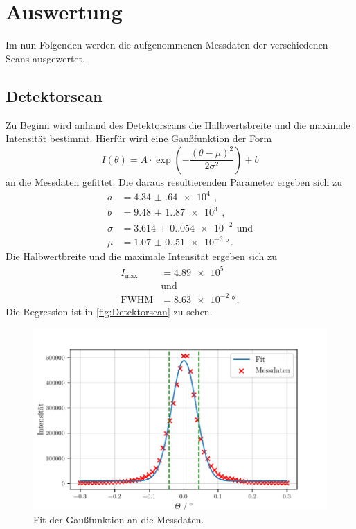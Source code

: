 \section{Auswertung}
\label{sec:Auswertung}

Im nun Folgenden werden die aufgenommenen Messdaten der verschiedenen Scans ausgewertet. 


\subsection{Detektorscan}
\label{sec:Detektorscan}

Zu Beginn wird anhand des Detektorscans die Halbwertsbreite und die maximale Intensität bestimmt.
Hierfür wird eine Gaußfunktion der Form
\begin{equation}
    I(\theta)= A \cdot \exp \left(-\frac{(\theta-\mu)^2}{2 \sigma^2}\right)+b
\end{equation}
an die Messdaten gefittet.
Die daraus resultierenden Parameter ergeben sich zu 
\begin{align*}
    a & = \qty{4.34(64)e4}{} \, , \\
    b & = \qty{9.48(1.87)e3}{} \, , \\
    \sigma & = \qty{3.614(0.054)e-2}{} \, \text{und} \\
    \mu & = \qty{1.07(0.51)e-3}{\degree} \, .
\end{align*}
Die Halbwertbreite und die maximale Intensität ergeben sich zu
\begin{align*}
    I_\text{max} &= \qty{4.89e5}{} \\
    &\text{und} \\
    \text{FWHM} &= \qty{8.63e-2}{\degree} \, .
\end{align*}
Die Regression ist in \autoref{fig:Detektorscan} zu sehen.
\begin{figure}
    \centering
    \includegraphics[width = 0.5 \linewidth]{build/Detektorscan.pdf}
    \caption{Fit der Gaußfunktion an die Messdaten.}
    \label{fig:Detektorscan}
\end{figure}


